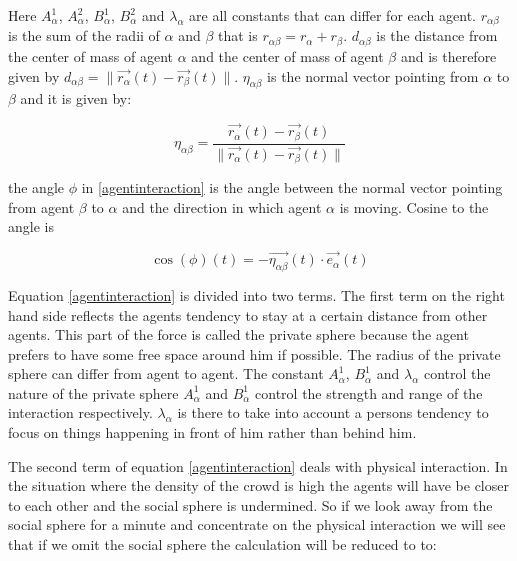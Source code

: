 Here $A_{\alpha}^{1}$, $A_{\alpha}^{2}$, $B_{\alpha}^{1}$, $B_{\alpha}^{2}$ 
and $\lambda_{\alpha}$ are all constants that can differ for each agent. 
$r_{\alpha \beta}$ is the sum of the radii of $\alpha$ and $\beta$ that is 
$r_{\alpha \beta} = r_{\alpha} + r_{\beta}$. $d_{\alpha \beta}$ is the 
distance from the center of mass of agent $\alpha$ and the center of mass of 
agent $\beta$ and is therefore given by $d_{\alpha \beta} = 
\|\vec{r_{\alpha}}\left( t \right) - \vec{r_{\beta}}\left( t \right) \|$.
$\eta_{\alpha \beta}$ is the normal vector pointing from $\alpha$ to $\beta$ 
and it is given by:

\begin{equation}
    \eta_{\alpha \beta} =
        \frac{\vec{r_{\alpha}}(t) - \vec{r_{\beta}}(t)}
             {\|\vec{r_{\alpha}}(t) - \vec{r_{\beta}}(t) \|}
\end{equation}

the angle $\phi$ in \eqref{agentinteraction} is the angle between the normal 
vector pointing from agent $\beta$ to $\alpha$ and the direction in which 
agent $\alpha$ is moving. Cosine to the angle is 

\begin{equation}
\cos \left( \phi \right)
	\left( t \right) 
		= 
	- \vec{\eta_{\alpha \beta}}
		\left( t \right) 
	\cdot 
\vec{e_{\alpha}}\left( t \right)
\end{equation}

Equation \eqref{agentinteraction} is divided into two terms. The first term on 
the right hand side reflects the agents tendency to stay at a certain distance 
from other agents. This part of the force is called the private sphere because 
the agent prefers to have some free space around him if possible. The radius 
of the private sphere can differ from agent to agent. The constant 
$A_{\alpha}^{1}$, $B_{\alpha}^{1}$ and $\lambda_{\alpha}$ control the nature 
of the private sphere $A_{\alpha}^1$ and $B_{\alpha}^1$ control the strength 
and range of the interaction respectively. $\lambda_{\alpha}$ is there to take 
into account a persons tendency to focus on things happening in front of him 
rather than behind him.	%

The second term of equation \eqref{agentinteraction} deals with physical interaction.
In the situation where the density of the crowd is high the agents will have be closer
to each other and the social sphere is undermined. %
So if we look away from the social sphere for a minute and concentrate on the physical
interaction we will see that if we omit the social sphere the calculation will be reduced to
to:

